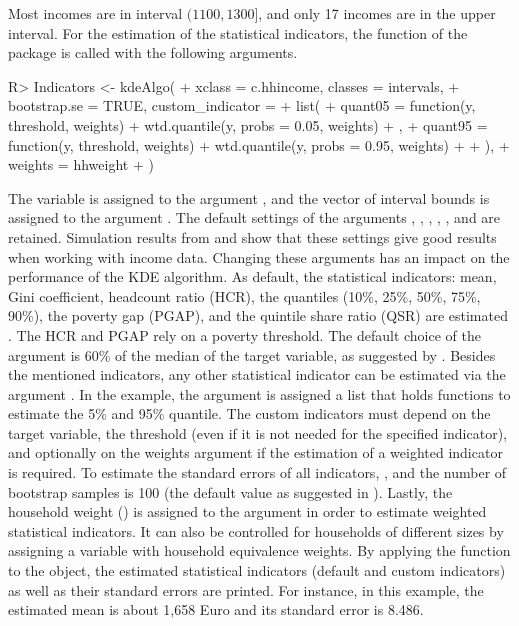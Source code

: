 Most incomes are in interval $(1100,1300]$, and only 17 incomes are in the upper interval. For the estimation of the statistical indicators, the function  of the  package is called with the following arguments. 

\begin{example}
R> Indicators <- kdeAlgo(
+    xclass = c.hhincome, classes = intervals, 
+    bootstrap.se = TRUE, custom_indicator = 
+     list(
+      quant05 = function(y, threshold, weights) {
+       wtd.quantile(y, probs = 0.05, weights)
+      }, 
+      quant95 = function(y, threshold, weights) {
+       wtd.quantile(y, probs = 0.95, weights)
+      }
+     ), 
+    weights = hhweight
+  )
\end{example}

The variable  is assigned to the argument , and the vector of interval bounds  is assigned to the argument . The default settings of the arguments , , , , , and  are retained. Simulation results from \citet{Wal19} and \citet{Gro17} show that these settings give good results when working with income data. Changing these arguments has an impact on the performance of the KDE algorithm. As default, the statistical indicators: mean, Gini coefficient, headcount ratio (HCR),  the quantiles (10\%, 25\%, 50\%, 75\%, 90\%), the poverty gap (PGAP), and the quintile share ratio (QSR) are estimated \citep{Gin12, Fos84}. The HCR and PGAP rely on a poverty threshold. The default choice of the  argument is 60\% of the median of the target variable, as suggested by \citet{Eur14}. Besides the mentioned indicators, any other statistical indicator can be estimated via the argument . In the example, the argument is assigned a list that holds functions to estimate the 5\% and 95\% quantile. The custom indicators must depend on the target variable, the threshold (even if it is not needed for the specified indicator), and optionally on the weights argument if the estimation of a weighted indicator is required. To estimate the standard errors of all indicators, , and the number of bootstrap samples is 100 (the default value as suggested in \citet{Wal19}).  Lastly, the household weight () is assigned to the argument  in order to estimate weighted statistical indicators. It can also be controlled for households of different sizes by assigning  a variable with household equivalence weights. By applying the  function to the  object, the estimated statistical indicators (default and custom indicators) as well as their standard errors are printed. For instance, in this example, the estimated mean is about 1,658 Euro and its standard error is 8.486.

